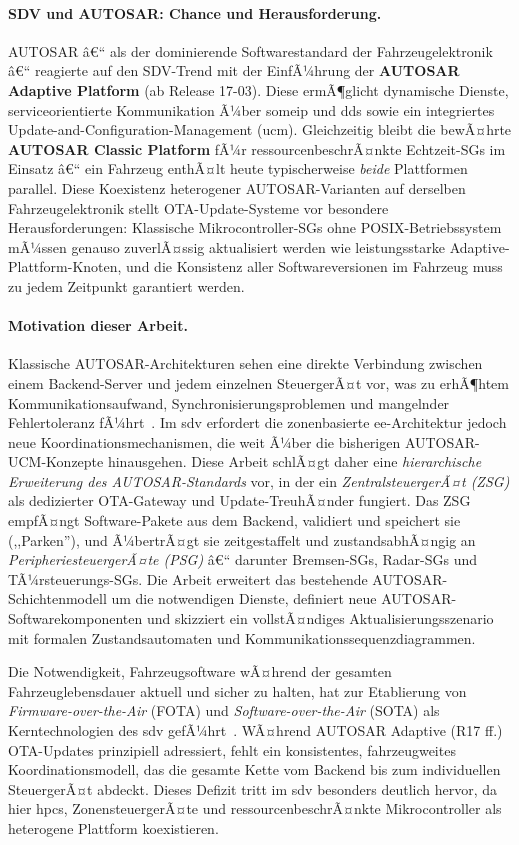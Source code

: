 ﻿\documentclass[12pt,a4paper,twoside]{article}
\begin{document}
\paragraph{SDV und AUTOSAR: Chance und Herausforderung.}
AUTOSAR â€“ als der dominierende Softwarestandard der Fahrzeugelektronik â€“
reagierte auf den SDV-Trend mit der EinfÃ¼hrung der
\textbf{AUTOSAR Adaptive Platform} (ab Release 17-03). Diese ermÃ¶glicht
dynamische Dienste, serviceorientierte Kommunikation Ã¼ber \gls{someip}
und \gls{dds} sowie ein integriertes Update-and-Configuration-Management
(\gls{ucm}). Gleichzeitig bleibt die bewÃ¤hrte
\textbf{AUTOSAR Classic Platform} fÃ¼r ressourcenbeschrÃ¤nkte Echtzeit-SGs
im Einsatz â€“ ein Fahrzeug enthÃ¤lt heute typischerweise \emph{beide}
Plattformen parallel. Diese Koexistenz heterogener AUTOSAR-Varianten
auf derselben Fahrzeugelektronik stellt OTA-Update-Systeme vor
besondere Herausforderungen: Klassische Mikrocontroller-SGs ohne
POSIX-Betriebssystem mÃ¼ssen genauso zuverlÃ¤ssig aktualisiert werden
wie leistungsstarke Adaptive-Plattform-Knoten, und die Konsistenz
aller Softwareversionen im Fahrzeug muss zu jedem Zeitpunkt
garantiert werden.

\paragraph{Motivation dieser Arbeit.}
Klassische AUTOSAR-Architekturen sehen eine direkte Verbindung zwischen
einem Backend-Server und jedem einzelnen SteuergerÃ¤t vor, was zu
erhÃ¶htem Kommunikationsaufwand, Synchronisierungsproblemen und
mangelnder Fehlertoleranz fÃ¼hrt~\cite{schneider2026ladekomm}. Im \gls{sdv}
erfordert die zonenbasierte \gls{ee}-Architektur jedoch neue
Koordinationsmechanismen, die weit Ã¼ber die bisherigen AUTOSAR-UCM-Konzepte
hinausgehen. Diese Arbeit schlÃ¤gt daher eine
\emph{hierarchische Erweiterung des AUTOSAR-Standards} vor, in der ein
\emph{ZentralsteuergerÃ¤t (ZSG)} als dedizierter OTA-Gateway und
Update-TreuhÃ¤nder fungiert. Das ZSG empfÃ¤ngt Software-Pakete aus dem
Backend, validiert und speichert sie (,,Parken''), und Ã¼bertrÃ¤gt sie
zeitgestaffelt und zustandsabhÃ¤ngig an \emph{PeripheriesteuergerÃ¤te (PSG)} â€“
darunter Bremsen-SGs, Radar-SGs und TÃ¼rsteuerungs-SGs. Die Arbeit erweitert
das bestehende AUTOSAR-Schichtenmodell um die notwendigen Dienste,
definiert neue AUTOSAR-Softwarekomponenten und skizziert ein vollstÃ¤ndiges
Aktualisierungsszenario mit formalen Zustandsautomaten und
Kommunikationssequenzdiagrammen.

Die Notwendigkeit, Fahrzeugsoftware wÃ¤hrend der gesamten Fahrzeuglebensdauer
aktuell und sicher zu halten, hat zur Etablierung von
\textit{Firmware-over-the-Air} (FOTA) und
\textit{Software-over-the-Air} (SOTA) als Kerntechnologien des
\gls{sdv} gefÃ¼hrt~\cite{nilsson2008key}. WÃ¤hrend AUTOSAR Adaptive (R17 ff.)
OTA-Updates prinzipiell adressiert, fehlt ein konsistentes, fahrzeugweites
Koordinationsmodell, das die gesamte Kette vom Backend bis zum individuellen
SteuergerÃ¤t abdeckt. Dieses Defizit tritt im \gls{sdv} besonders deutlich
hervor, da hier \glspl{hpc}, ZonensteuergerÃ¤te und ressourcenbeschrÃ¤nkte
Mikrocontroller als heterogene Plattform koexistieren.
\end{document}
